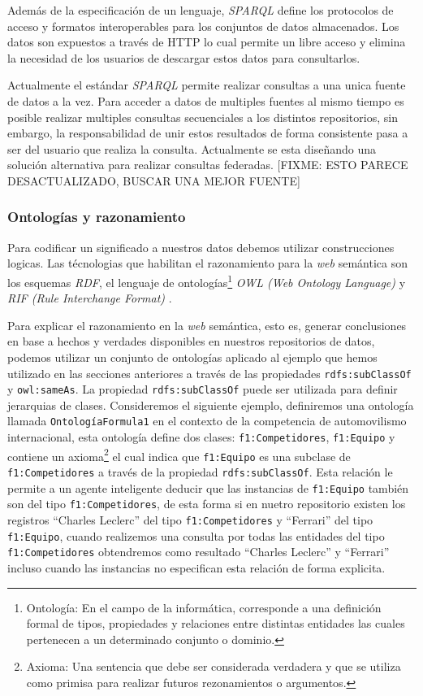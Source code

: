Además de la especificación de un lenguaje, \textit{SPARQL} define los
protocolos de acceso y formatos interoperables para los conjuntos de datos
almacenados. Los datos son expuestos a través de HTTP lo cual permite un libre
acceso y elimina la necesidad de los usuarios de descargar estos datos para
consultarlos.

Actualmente el estándar \textit{SPARQL} permite realizar consultas a una unica
fuente de datos a la vez. Para acceder a datos de multiples fuentes al mismo
tiempo es posible realizar multiples consultas secuenciales a los distintos
repositorios, sin embargo, la responsabilidad de unir estos resultados de forma
consistente pasa a ser del usuario que realiza la consulta. Actualmente se esta
diseñando una solución alternativa para realizar consultas federadas. [FIXME:
ESTO PARECE DESACTUALIZADO, BUSCAR UNA MEJOR FUENTE]

\subsubsection{Ontologías y razonamiento}
\label{sec:ontologia-y-razonamiento}

Para codificar un significado a nuestros datos debemos utilizar construcciones
logicas. Las técnologias que habilitan el razonamiento para la \textit{web}
semántica son los esquemas \textit{RDF}, el lenguaje de
ontologías\footnote{Ontología: En el campo de la informática, corresponde a una
definición formal de tipos, propiedades y relaciones entre distintas entidades
las cuales pertenecen a un determinado conjunto o dominio.} \textit{OWL (Web
Ontology Language)} \cite{antoniou2004web} y \textit{RIF (Rule Interchange
Format)} \cite{kifer2008rule}.

Para explicar el razonamiento en la \textit{web} semántica, esto es, generar
conclusiones en base a hechos y verdades disponibles en nuestros repositorios de
datos, podemos utilizar un conjunto de ontologías aplicado al ejemplo que hemos
utilizado en las secciones anteriores a través de las propiedades
\texttt{rdfs:subClassOf} y \texttt{owl:sameAs}. La propiedad
\texttt{rdfs:subClassOf} puede ser utilizada para definir jerarquias de clases.
Consideremos el siguiente ejemplo, definiremos una ontología llamada
\texttt{OntologíaFormula1} en el contexto de la competencia de automovilismo
internacional, esta ontología define dos clases: \texttt{f1:Competidores},
\texttt{f1:Equipo} y contiene un axioma\footnote{Axioma: Una sentencia que debe
ser considerada verdadera y que se utiliza como primisa para realizar futuros
rezonamientos o argumentos.} el cual indica que \texttt{f1:Equipo} es una
subclase de \texttt{f1:Competidores} a través de la propiedad
\texttt{rdfs:subClassOf}. Esta relación le permite a un agente inteligente
deducir que las instancias de \texttt{f1:Equipo} también son del tipo
\texttt{f1:Competidores}, de esta forma si en nuetro repositorio existen los
registros ``Charles Leclerc'' del tipo \texttt{f1:Competidores} y ``Ferrari''
del tipo \texttt{f1:Equipo}, cuando realizemos una consulta por todas las
entidades del tipo \texttt{f1:Competidores} obtendremos como resultado ``Charles
Leclerc'' y ``Ferrari'' incluso cuando las instancias no especifican esta
relación de forma explicita.


